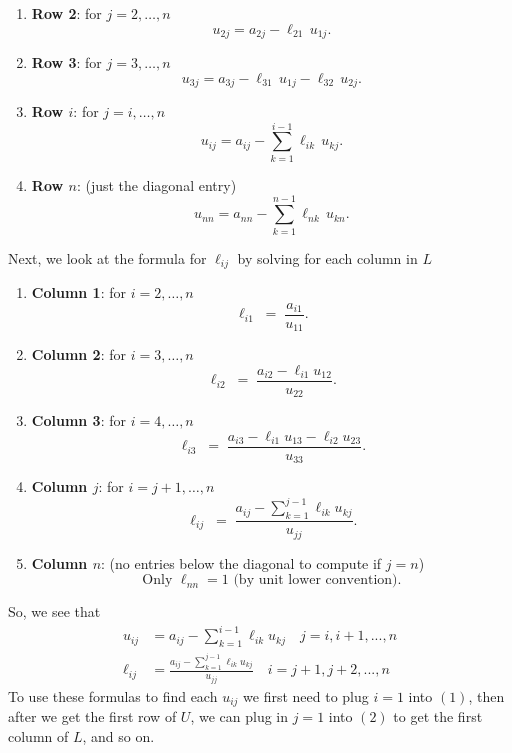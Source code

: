 \documentclass{report}
\begin{document}
\begin{itemize}
\begin{enumerate}
            \item \textbf{Row 2}: for $j=2,\dots,n$
                \[
                    u_{2j} = a_{2j} - \ell_{21}\,u_{1j}.
                \]

            \item \textbf{Row 3}: for $j=3,\dots,n$
                \[
                    u_{3j} = a_{3j} - \ell_{31}\,u_{1j} - \ell_{32}\,u_{2j}.
                \]

            \item \textbf{Row $i$}: for $j=i,\dots,n$
                \[
                    u_{ij} = a_{ij} - \sum_{k=1}^{i-1} \ell_{ik}\,u_{kj}.
                \]

            \item \textbf{Row $n$}: (just the diagonal entry)
                \[
                    u_{nn} = a_{nn} - \sum_{k=1}^{n-1} \ell_{nk}\,u_{kn}.
                \]
        \end{enumerate}
        Next, we look at the formula for $\ell_{ij}$ by solving for each column in $L$
        \begin{enumerate}
            \item \textbf{Column 1}: for $i=2,\dots,n$
                \[
                    \ell_{i1} \;=\; \frac{a_{i1}}{u_{11}}.
                \]
            \item \textbf{Column 2}: for $i=3,\dots,n$
                \[
                    \ell_{i2} \;=\; \frac{a_{i2} - \ell_{i1}u_{12}}{u_{22}}.
                \]
            \item \textbf{Column 3}: for $i=4,\dots,n$
                \[
                    \ell_{i3} \;=\; \frac{a_{i3} - \ell_{i1}u_{13} - \ell_{i2}u_{23}}{u_{33}}.
                \]
            \item \textbf{Column $j$}: for $i=j+1,\dots,n$
                \[
                    \ell_{ij} \;=\; \frac{a_{ij} - \sum_{k=1}^{j-1}\ell_{ik}u_{kj}}{u_{jj}}.
                \]
            \item \textbf{Column $n$}: (no entries below the diagonal to compute if $j=n$)
                \[
                    \text{Only } \ell_{nn}=1 \text{ (by unit lower convention).}
                \]
        \end{enumerate}
        So, we see that
        \begin{align*}
            u_{ij} &= a_{ij} - \sum_{k=1}^{i-1}\ell_{ik}u_{kj} \quad j=i,i+1,...,n \tag{1} \\
            \ell_{ij} &= \frac{a_{ij} - \sum_{k=1}^{j-1}\ell_{ik}u_{kj}}{u_{jj}} \quad i=j+1,j+2,...,n \tag{2}
        \end{align*}
        \bigbreak \noindent 
        To use these formulas to find each $u_{ij}$ we first need to plug $i=1$ into $(1)$, then after we get the first row of $U$, we can plug in $j=1$ into $(2)$ to get the first column of $L$, and so on.


\end{itemize}
\end{document}
